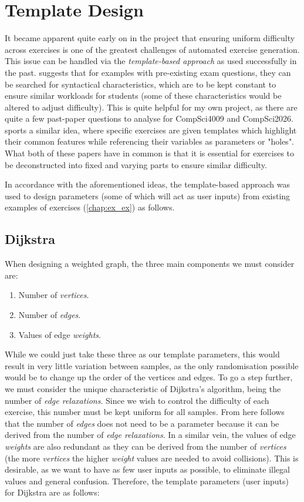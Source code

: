 \documentclass{l4proj}
\begin{document}
\section{Template Design}
\label{sec:td}

It became apparent quite early on in the project that ensuring uniform difficulty across exercises is one of the greatest challenges of automated exercise generation. This issue can be handled via the \emph{template-based approach} as used successfully in the past. \citet{Hoz21} suggests that for examples with pre-existing exam questions, they can be searched for syntactical characteristics, which are to be kept constant to ensure similar workloads for students (some of these characteristics would be altered to adjust difficulty). This is quite helpful for my own project, as there are quite a few past-paper questions to analyse for CompSci4009 and CompSci2026. \citet{Sad12} sports a similar idea, where specific exercises are given templates which highlight their common features while referencing their variables as parameters or "holes". What both of these papers have in common is that it is essential for exercises to be deconstructed into fixed and varying parts to ensure similar difficulty.

In accordance with the aforementioned ideas, the template-based approach was used to design parameters (some of which will act as user inputs) from existing examples of exercises (\autoref{chap:ex_ex}) as follows.

\subsection{Dijkstra}
\label{sec:tdd}

When designing a weighted graph, the three main components we must consider are:

\begin{enumerate}
	\item
 	Number of \emph{vertices}.
	\item
	Number of \emph{edges}.
	\item
	Values of edge \emph{weights}.
\end{enumerate}

While we could just take these three as our template parameters, this would result in very little variation between samples, as the only randomisation possible would be to change up the order of the vertices and edges. To go a step further, we must consider the unique characteristic of Dijkstra's algorithm, being the number of \emph{edge relaxations}. Since we wish to control the difficulty of each exercise, this number must be kept uniform for all samples. From here follows that the number of \emph{edges} does not need to be a parameter because it can be derived from the number of \emph{edge relaxations}. In a similar vein, the values of edge \emph{weights} are also redundant as they can be derived from the number of \emph{vertices} (the more \emph{vertices} the higher \emph{weight} values are needed to avoid collisions). This is desirable, as we want to have as few user inputs as possible, to eliminate illegal values and general confusion. Therefore, the template parameters (user inputs) for Dijkstra are as follows:
\end{document}

